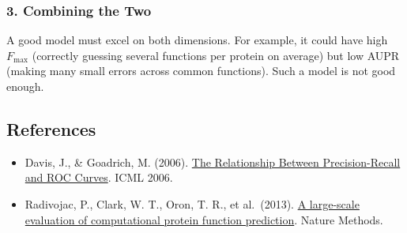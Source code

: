 \hypertarget{combining-the-two}{%
\subsubsection{3. Combining the Two}\label{combining-the-two}}

A good model must excel on both dimensions. For example, it could have high \(F_{\max}\) (correctly guessing several functions per protein on average) but low AUPR (making many small errors across common functions). Such a model is not good enough.

\FloatBarrier
{}
\hypertarget{references-33}{%
\subsection{References}\label{references-33}}

\vspace{0.25em}
\begin{itemize}
\tightlist
\item
  Davis, J., \& Goadrich, M. (2006). \href{https://doi.org/10.1145/1143844.1143874}{The Relationship Between Precision-Recall and ROC Curves}. ICML 2006.
\item
  Radivojac, P., Clark, W. T., Oron, T. R., et al.~(2013). \href{https://www.nature.com/articles/nmeth.2340}{A large-scale evaluation of computational protein function prediction}. Nature Methods.
\end{itemize}

\clearpage
